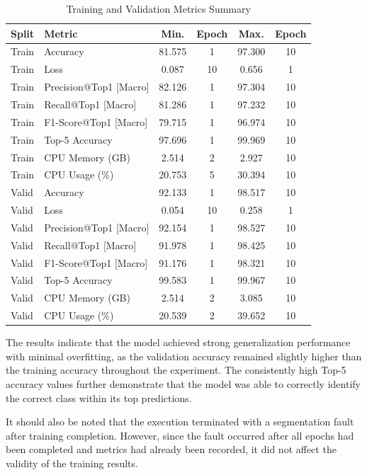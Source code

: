 \documentclass[10pt,a4paper,twocolumn]{article}
\begin{document}
\begin{table}[t!]
\centering
\caption{Training and Validation Metrics Summary}
\begin{tabular}{|l|l|c|c|c|c|}
\hline
\textbf{Split} & \textbf{Metric} & \textbf{Min.} & \textbf{Epoch} & \textbf{Max.} & \textbf{Epoch} \\
\hline
Train & Accuracy & 81.575 & 1 & 97.300 & 10 \\
Train & Loss & 0.087 & 10 & 0.656 & 1 \\
Train & Precision@Top1 [Macro] & 82.126 & 1 & 97.304 & 10 \\
Train & Recall@Top1 [Macro] & 81.286 & 1 & 97.232 & 10 \\
Train & F1-Score@Top1 [Macro] & 79.715 & 1 & 96.974 & 10 \\
Train & Top-5 Accuracy & 97.696 & 1 & 99.969 & 10 \\
Train & CPU Memory (GB) & 2.514 & 2 & 2.927 & 10 \\
Train & CPU Usage (\%) & 20.753 & 5 & 30.394 & 10 \\
\hline
Valid & Accuracy & 92.133 & 1 & 98.517 & 10 \\
Valid & Loss & 0.054 & 10 & 0.258 & 1 \\
Valid & Precision@Top1 [Macro] & 92.154 & 1 & 98.527 & 10 \\
Valid & Recall@Top1 [Macro] & 91.978 & 1 & 98.425 & 10 \\
Valid & F1-Score@Top1 [Macro] & 91.176 & 1 & 98.321 & 10 \\
Valid & Top-5 Accuracy & 99.583 & 1 & 99.967 & 10 \\
Valid & CPU Memory (GB) & 2.514 & 2 & 3.085 & 10 \\
Valid & CPU Usage (\%) & 20.539 & 2 & 39.652 & 10 \\
\hline
\end{tabular}
\label{tab:cnn_metrics_summary}
\end{table}

The results indicate that the model achieved strong generalization performance with minimal overfitting, as the validation accuracy remained slightly higher than the training accuracy throughout the experiment. The consistently high Top-5 accuracy values further demonstrate that the model was able to correctly identify the correct class within its top predictions.

It should also be noted that the execution terminated with a segmentation fault after training completion. However, since the fault occurred after all epochs had been completed and metrics had already been recorded, it did not affect the validity of the training results. \\
\end{document}
